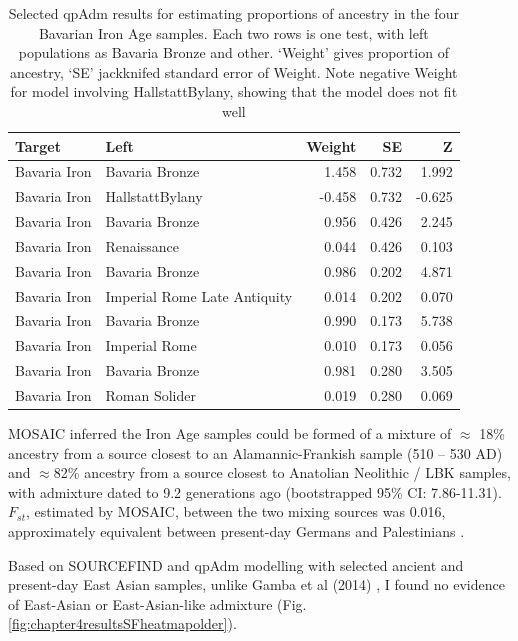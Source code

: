 \begin{table}
\centering
\begin{tabular}[t]{llrrr}
\toprule
Target & Left & Weight & SE & Z\\
\midrule
Bavaria Iron & Bavaria Bronze & 1.458 & 0.732 & 1.992\\
Bavaria Iron & HallstattBylany & -0.458 & 0.732 & -0.625\\
\addlinespace
Bavaria Iron & Bavaria Bronze & 0.956 & 0.426 & 2.245\\
Bavaria Iron & Renaissance & 0.044 & 0.426 & 0.103\\
\addlinespace
Bavaria Iron & Bavaria Bronze & 0.986 & 0.202 & 4.871\\
Bavaria Iron & Imperial Rome Late Antiquity & 0.014 & 0.202 & 0.070\\
\addlinespace
Bavaria Iron & Bavaria Bronze & 0.990 & 0.173 & 5.738\\
Bavaria Iron & Imperial Rome & 0.010 & 0.173 & 0.056\\
\addlinespace
Bavaria Iron & Bavaria Bronze & 0.981 & 0.280 & 3.505\\
Bavaria Iron & Roman Solider & 0.019 & 0.280 & 0.069\\
\bottomrule
\end{tabular}
\caption{Selected qpAdm results for estimating proportions of ancestry in the four Bavarian Iron Age samples. Each two rows is one test, with left populations as Bavaria Bronze and other. `Weight' gives proportion of ancestry, `SE' jackknifed standard error of Weight. Note negative Weight for model involving  HallstattBylany, showing that the model does not fit well}
\label{tab:IronAge_qpAdm}
\end{table}


MOSAIC inferred the Iron Age samples could be formed of a mixture of $\approx$ 18\% ancestry from a source closest to an Alamannic-Frankish sample (510 – 530 AD) and $\approx$82\% ancestry from a source closest to Anatolian Neolithic / LBK samples, with admixture dated to 9.2 generations ago (bootstrapped 95\% CI: 7.86-11.31). $F_{st}$, estimated by MOSAIC, between the two mixing sources was 0.016, approximately equivalent between present-day Germans and Palestinians \cite{nelis2009genetic}.  


Based on SOURCEFIND and qpAdm modelling with selected ancient and present-day East Asian samples, unlike Gamba et al (2014) \cite{Gamba2014}, I found no evidence of East-Asian or East-Asian-like admixture (Fig. \ref{fig:chapter4resultsSFheatmapolder}).


